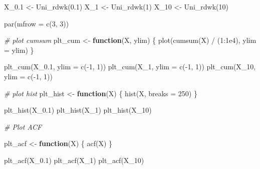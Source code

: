 \documentclass[
]{article}
\newenvironment{Shaded}{\begin{snugshade}}{\end{snugshade}}
\newcommand{\AttributeTok}[1]{\textcolor[rgb]{0.77,0.63,0.00}{#1}}
\newcommand{\CommentTok}[1]{\textcolor[rgb]{0.56,0.35,0.01}{\textit{#1}}}
\newcommand{\ControlFlowTok}[1]{\textcolor[rgb]{0.13,0.29,0.53}{\textbf{#1}}}
\newcommand{\DecValTok}[1]{\textcolor[rgb]{0.00,0.00,0.81}{#1}}
\newcommand{\FloatTok}[1]{\textcolor[rgb]{0.00,0.00,0.81}{#1}}
\newcommand{\FunctionTok}[1]{\textcolor[rgb]{0.00,0.00,0.00}{#1}}
\newcommand{\NormalTok}[1]{#1}
\newcommand{\OtherTok}[1]{\textcolor[rgb]{0.56,0.35,0.01}{#1}}
\newcommand{\SpecialCharTok}[1]{\textcolor[rgb]{0.00,0.00,0.00}{#1}}
\begin{document}
\begin{Shaded}
\begin{Highlighting}[]
\NormalTok{X\_0}\FloatTok{.1} \OtherTok{\textless{}{-}} \FunctionTok{Uni\_rdwk}\NormalTok{(}\FloatTok{0.1}\NormalTok{)}
\NormalTok{X\_1 }\OtherTok{\textless{}{-}} \FunctionTok{Uni\_rdwk}\NormalTok{(}\DecValTok{1}\NormalTok{)}
\NormalTok{X\_10 }\OtherTok{\textless{}{-}} \FunctionTok{Uni\_rdwk}\NormalTok{(}\DecValTok{10}\NormalTok{)}


\FunctionTok{par}\NormalTok{(}\AttributeTok{mfrow =} \FunctionTok{c}\NormalTok{(}\DecValTok{3}\NormalTok{, }\DecValTok{3}\NormalTok{))}

\CommentTok{\# plot cumsum}
\NormalTok{plt\_cum }\OtherTok{\textless{}{-}} \ControlFlowTok{function}\NormalTok{(X, ylim) \{}
  \FunctionTok{plot}\NormalTok{(}\FunctionTok{cumsum}\NormalTok{(X) }\SpecialCharTok{/}\NormalTok{ (}\DecValTok{1}\SpecialCharTok{:}\FloatTok{1e4}\NormalTok{), }\AttributeTok{ylim =}\NormalTok{ ylim)}
\NormalTok{\}}

\FunctionTok{plt\_cum}\NormalTok{(X\_0}\FloatTok{.1}\NormalTok{, }\AttributeTok{ylim =} \FunctionTok{c}\NormalTok{(}\SpecialCharTok{{-}}\DecValTok{1}\NormalTok{, }\DecValTok{1}\NormalTok{))}
\FunctionTok{plt\_cum}\NormalTok{(X\_1, }\AttributeTok{ylim =} \FunctionTok{c}\NormalTok{(}\SpecialCharTok{{-}}\DecValTok{1}\NormalTok{, }\DecValTok{1}\NormalTok{))}
\FunctionTok{plt\_cum}\NormalTok{(X\_10, }\AttributeTok{ylim =} \FunctionTok{c}\NormalTok{(}\SpecialCharTok{{-}}\DecValTok{1}\NormalTok{, }\DecValTok{1}\NormalTok{))}


\CommentTok{\# plot hist}
\NormalTok{plt\_hist }\OtherTok{\textless{}{-}} \ControlFlowTok{function}\NormalTok{(X) \{}
  \FunctionTok{hist}\NormalTok{(X, }\AttributeTok{breaks =} \DecValTok{250}\NormalTok{)}
\NormalTok{\}}

\FunctionTok{plt\_hist}\NormalTok{(X\_0}\FloatTok{.1}\NormalTok{)}
\FunctionTok{plt\_hist}\NormalTok{(X\_1)}
\FunctionTok{plt\_hist}\NormalTok{(X\_10)}



\CommentTok{\# Plot ACF}

\NormalTok{plt\_acf }\OtherTok{\textless{}{-}} \ControlFlowTok{function}\NormalTok{(X) \{}
  \FunctionTok{acf}\NormalTok{(X)}
\NormalTok{\}}

\FunctionTok{plt\_acf}\NormalTok{(X\_0}\FloatTok{.1}\NormalTok{)}
\FunctionTok{plt\_acf}\NormalTok{(X\_1)}
\FunctionTok{plt\_acf}\NormalTok{(X\_10)}
\end{Highlighting}
\end{Shaded}
\end{document}

